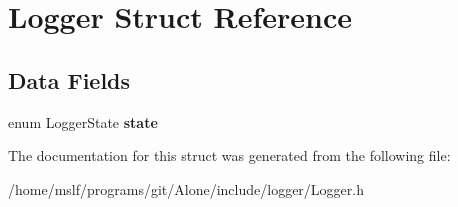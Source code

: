 \hypertarget{struct_logger}{}\section{Logger Struct Reference}
\label{struct_logger}
\subsection*{Data Fields}
\begin{DoxyCompactItemize}
\item 
\hypertarget{struct_logger_a3fb7893f6204638fe146909298361904}{}\label{struct_logger_a3fb7893f6204638fe146909298361904} 
enum Logger\+State {\bfseries state}
\end{DoxyCompactItemize}


The documentation for this struct was generated from the following file\+:\begin{DoxyCompactItemize}
\item 
/home/mslf/programs/git/\+Alone/include/logger/Logger.\+h\end{DoxyCompactItemize}

